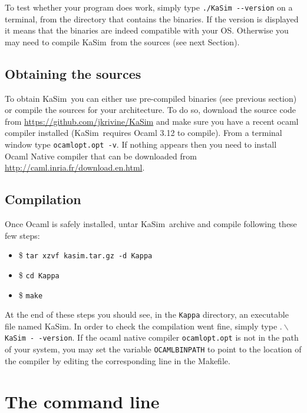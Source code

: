\documentclass[11pt]{book}
\def\KaSim{\textsf{KaSim}}
\def\ttt#1{\texttt{#1}}
\def\bs{\backslash}
\def\ITE#1{\begin{itemize}#1\end{itemize}}
\def\dd{-\hspace{0.001cm}-}
\begin{document}
To test whether your program does work, simply type \ttt{./KaSim \dd version} on a terminal, from the directory that contains the binaries. If the version is displayed it means that the binaries are indeed compatible with your OS. Otherwise you may need to compile \KaSim~from the sources (see next Section).

\section{Obtaining the sources}\label{sec:sources}
To obtain \KaSim~you can either use pre-compiled binaries (see previous section) or compile the sources for your architecture. To do so, download the source code from \url{https://github.com/jkrivine/KaSim} and make sure you have a recent ocaml compiler installed (\KaSim~requires Ocaml 3.12 to compile). From a terminal window type \ttt{ocamlopt.opt -v}. If nothing appears then you need to install Ocaml Native compiler that can be downloaded from \url{http://caml.inria.fr/download.en.html}. 

\section{Compilation}
Once Ocaml is safely installed, untar \KaSim~archive and compile following these few steps:
\ITE{
\item[\$]\ttt{tar xzvf kasim.tar.gz -d Kappa}
\item[\$]\ttt{cd Kappa}
\item[\$]\ttt{make}
}
At the end of these steps you should see, in the \ttt{Kappa} directory, an executable file named KaSim.  In order to check the compilation went fine, simply type $.\bs$\ttt{KaSim -\,-version}. If the ocaml native compiler \ttt{ocamlopt.opt} is not in the path of your system, you may set the variable \ttt{OCAMLBINPATH} to point to the location of the compiler by editing the corresponding line in the Makefile.

\chapter{The command line}\label{chap:cl}
\end{document}
